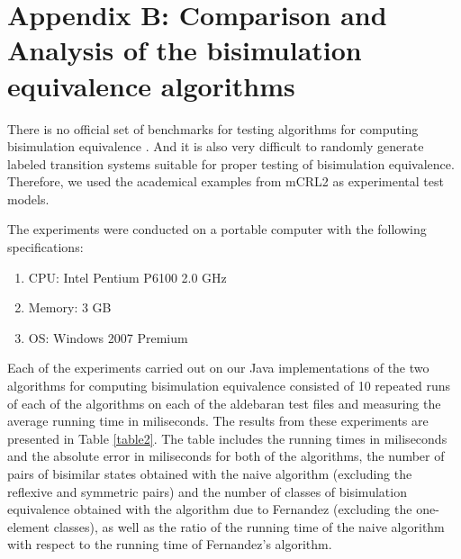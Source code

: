 \section*{Appendix B: Comparison and Analysis of the bisimulation equivalence algorithms}

There is no official set of benchmarks for testing algorithms for computing bisimulation equivalence \cite{PiazzaPolicriti}. And it is also very difficult to randomly generate labeled transition systems suitable for proper testing of bisimulation equivalence. Therefore, we used the academical examples from mCRL2 as experimental test models. 

The experiments were conducted on a portable computer with the following specifications: 
\begin{enumerate}
	\item CPU: Intel Pentium P6100 2.0 GHz
	\item Memory: 3 GB
	\item OS: Windows 2007 Premium
\end{enumerate}

Each of the experiments carried out on our Java implementations of the two algorithms for computing bisimulation equivalence consisted of 10 repeated runs of each of the algorithms on each of the aldebaran test files and measuring the average running time in miliseconds. 
The results from these experiments are presented in Table \ref{table2}. The table includes the running times in miliseconds and the absolute error in miliseconds for both of the algorithms, the number of pairs of bisimilar states obtained with the naive algorithm (excluding the reflexive and symmetric pairs) and the number of classes of bisimulation equivalence obtained with the algorithm due to Fernandez (excluding the one-element classes), as well as the ratio of the running time of the naive algorithm with respect to the running time of Fernandez's algorithm.

